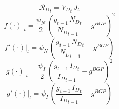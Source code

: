 \documentclass[10pt,a4paper]{article}
\begin{document}
\begin{dmath}
{\mathcal{R}_{D}}_{t}={V_D}_{t}\, {J}_{t}
\end{dmath}
\begin{dmath}
{\left.       f\left( \cdot \right)            \right|}_{t}=\frac{\psi_N}{2}\, \left(\frac{{g}_{t-1}\, {N_D}_{t}}{{N_D}_{t-1}}-g^{BGP}\right)^{2}
\end{dmath}
\begin{dmath}
{\left.       f^‎{\prime}\left( \cdot \right)   \right|}_{t}=\psi_N\, \left(\frac{{g}_{t-1}\, {N_D}_{t}}{{N_D}_{t-1}}-g^{BGP}\right)
\end{dmath}
\begin{dmath}
{\left.       g\left( \cdot \right)            \right|}_{t}=\frac{\psi_I}{2}\, \left(\frac{{g}_{t-1}\, {I_D}_{t}}{{I_D}_{t-1}}-g^{BGP}\right)^{2}
\end{dmath}
\begin{dmath}
{\left.       g^‎{\prime}\left( \cdot \right)   \right|}_{t}=\psi_I\, \left(\frac{{g}_{t-1}\, {I_D}_{t}}{{I_D}_{t-1}}-g^{BGP}\right)
\end{dmath}
\end{document}
